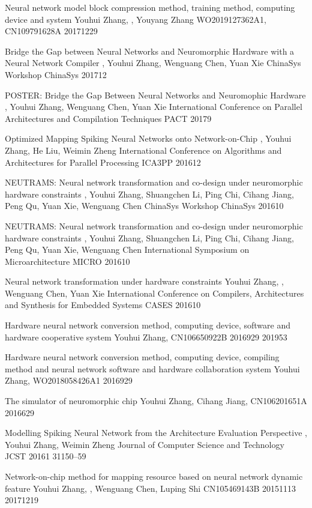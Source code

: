 {Neural network model block compression method, training method, computing device and system}
{Youhui Zhang, , Youyang Zhang}
{WO2019127362A1, CN109791628A}
{2017}{12}{29}

{Bridge the Gap between Neural Networks and Neuromorphic Hardware with a Neural Network Compiler}
{, Youhui Zhang, Wenguang Chen, Yuan Xie}
{ChinaSys Workshop}
{ChinaSys}
{2017}{12}

{POSTER: Bridge the Gap Between Neural Networks and Neuromophic Hardware}
{, Youhui Zhang, Wenguang Chen, Yuan Xie}
{International Conference on Parallel Architectures and Compilation Techniques}
{PACT}
{2017}{9}

{Optimized Mapping Spiking Neural Networks onto Network-on-Chip}
{, Youhui Zhang, He Liu, Weimin Zheng}
{International Conference on Algorithms and Architectures for Parallel Processing}
{ICA3PP}
{2016}{12}

{NEUTRAMS: Neural network transformation and co-design under neuromorphic hardware constraints}
{, Youhui Zhang, Shuangchen Li, Ping Chi, Cihang Jiang, Peng Qu, Yuan Xie, Wenguang Chen}
{ChinaSys Workshop}
{ChinaSys}
{2016}{10}

{NEUTRAMS: Neural network transformation and co-design under neuromorphic hardware constraints}
{, Youhui Zhang, Shuangchen Li, Ping Chi, Cihang Jiang, Peng Qu, Yuan Xie, Wenguang Chen}
{International Symposium on Microarchitecture}
{MICRO}
{2016}{10}

{Neural network transformation under hardware constraints}
{Youhui Zhang, , Wenguang Chen, Yuan Xie}
{International Conference on Compilers, Architectures and Synthesis for Embedded Systems}
{CASES}
{2016}{10}

{Hardware neural network conversion method, computing device, software and hardware cooperative system}
{Youhui Zhang, }
{CN106650922B}
{2016}{9}{29}
{2019}{5}{3}

{Hardware neural network conversion method, computing device, compiling method and neural network software and hardware collaboration system}
{Youhui Zhang, }
{WO2018058426A1}
{2016}{9}{29}

{The simulator of neuromorphic chip}
{Youhui Zhang, Cihang Jiang, }
{CN106201651A}
{2016}{6}{29}

{Modelling Spiking Neural Network from the Architecture Evaluation Perspective}
{, Youhui Zhang, Weimin Zheng}
{Journal of Computer Science and Technology}
{JCST}
{2016}{1}
{31}{1}{50--59}

{Network-on-chip method for mapping resource based on neural network dynamic feature}
{Youhui Zhang, , Wenguang Chen, Luping Shi}
{CN105469143B}
{2015}{11}{13}
{2017}{12}{19}